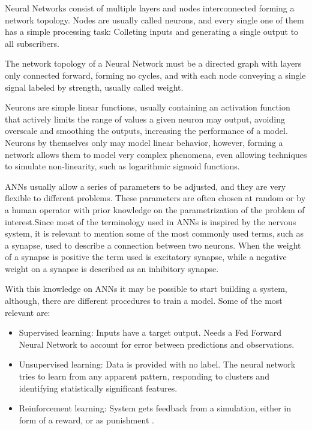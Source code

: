 Neural Networks consist of multiple layers and nodes interconnected forming a network topology. Nodes are usually called neurons, and every single one of them has a simple processing task: Colleting inputs and generating a single output to all subscribers.

The network topology of a Neural Network must be a directed graph with layers only connected forward, forming no cycles, and with each node conveying a single signal labeled by strength, usually called weight.

Neurons are simple linear functions, usually containing an activation function that actively limits the range of values a given neuron may output, avoiding overscale and smoothing the outputs, increasing the performance of a model. Neurons by themselves only may model linear behavior, however, forming a network allows them to model very complex phenomena, even allowing techniques to simulate non-linearity, such as logarithmic sigmoid functions.

ANNs usually allow a series of parameters to be adjusted, and they are very flexible to different problems. These parameters are often chosen at random or by a human operator with prior knowledge on the parametrization of the problem of interest.Since most of the terminology used in ANNs is inspired by the nervous system, it is relevant to mention some of the most commonly used terms, such as a synapse, used to describe a connection between two neurons. When the weight of a synapse is positive the term used is excitatory synapse, while a negative weight on a synapse is described as an inhibitory synapse.

With this knowledge on ANNs it may be possible to start building a system, although, there are different procedures to train a model. Some of the most relevant are:

\begin{itemize}
    \item Supervised learning: Inputs have a target output. Needs a Fed Forward Neural Network to account for error between predictions and observations.
    \item Unsupervised learning: Data is provided with no label. The neural network tries to learn from any apparent pattern, responding to clusters and identifying statistically significant features.
    \item Reinforcement learning: System gets feedback from a simulation, either in form of a reward, or as punishment \cite{dongare2012}.
\end{itemize}

